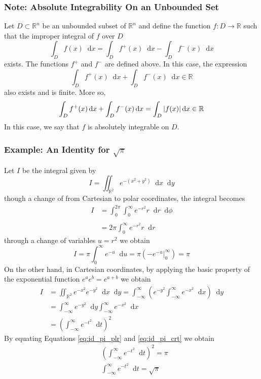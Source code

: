 \documentclass[11pt, a4paper]{article}
\newcommand{\diff}{\mathop{}\!\mathrm{d}} %
\begin{document}
\subsubsection{Note: Absolute Integrability On an Unbounded Set}
Let $ D \subset \mathbb{R}^n $ be an unbounded subset of $ \mathbb{R}^{n} $ and define the function $ f : D \rightarrow \mathbb{R} $ such that the improper integral of $ f $ over $ D $
\begin{equation*}
	\int_D f(x) \diff x = \int_D f^+(x) \diff x - \int_D f^-(x) \diff x
\end{equation*}
exists. The functions $ f^+ $ and $ f^- $ are defined above. In this case, the expression 
\begin{equation*}
	\int_D f^+(x) \diff x + \int_D f^-(x) \diff x \in \mathbb{R}
\end{equation*}
also exists and is finite. More so,
\begin{equation*}
	\int_D f^+(x) \diff x + \int_D f^-(x) \diff x = \int_D \abs{f(x)} \diff x \in \mathbb{R}
\end{equation*}
In this case, we say that $ f $ is absolutely integrable on $ D $.


\subsubsection{Example: An Identity for $ \sqrt{\pi} $}
Let $ I $ be the integral given by
\begin{equation*}
	I = \iint_{\mathbb{R}^2} e^{-(x^2 + y^2)} \diff x \diff y
\end{equation*}
though a change of from Cartesian to polar coordinates, the integral becomes
\begin{align*}
	I & = \int_{0}^{2\pi} \int_{0}^{\infty} e^{-r^2} r \diff r \diff \phi \\[1.5ex]\\
	& = 2\pi \int_{0}^{\infty} e^{-r^2 }r \diff r
\end{align*}
through a change of variables $ u = r^2 $ we obtain
\begin{equation}
I = \pi \int_{0}^{\infty} e^{-u} \diff u = \pi \left(- e^{-u} \bigg |_{0}^{\infty}\right) = \pi \label{eq:id_pi_plr}
\end{equation}
On the other hand, in Cartesian coordinates, by applying the basic property of the exponential function $ e^a e^b = e^{a + b} $ we obtain
\begin{align}
	I &= \iint_{\mathbb{R}^2} e^{-x^2} e^{-y^2} \diff x \diff y = \int_{-\infty}^{\infty} \left(e^{-y^2} \int_{-\infty}^{\infty} e^{-x^2} \diff x\right) \diff y \nonumber \\[1.5ex]
	& = \int_{-\infty}^{\infty} e^{-y^2} \diff y \int_{-\infty}^{\infty} e^{-x^2} \diff x \nonumber \\[1.5ex]
	& = \left(\int_{-\infty}^{\infty} e^{-t^2} \diff t\right)^2 \label{eq:id_pi_crt}
\end{align}
By equating Equations \ref{eq:id_pi_plr} and \ref{eq:id_pi_crt} we obtain
\begin{align*}
	&\left(\int_{-\infty}^{\infty} e^{-t^2} \diff t\right)^2 = \pi \\[1.5ex]
	&\int_{-\infty}^{\infty} e^{-t^2}\diff t = \sqrt{\pi} 
\end{align*}
\end{document}
